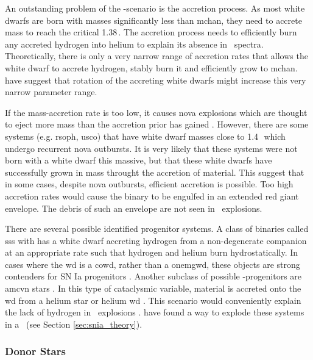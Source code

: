 An outstanding problem of the \sd-scenario is the accretion process.  As most white dwarfs are born with masses significantly less than \gls{mchan}, they need to accrete mass to reach the critical 1.38\,\msun. The accretion process needs to efficiently burn any accreted hydrogen into helium to  explain its absence in \sneia\ spectra. Theoretically, there is only a very narrow range of accretion rates that allows the white dwarf to accrete hydrogen, stably burn it and efficiently grow to \gls{mchan}. \cite{2004A&A...419..623Y} have suggest that rotation of the accreting white dwarfs might increase this very narrow parameter range.

 If the mass-accretion rate is too low, it causes nova explosions which are thought to eject more mass than the accretion prior has gained \citep{Nomoto:1982p451}. However, there are some systems (e.g. \gls{rsoph}, \gls{usco}) that have white dwarf masses close to 1.4\,\msun\ which undergo recurrent nova outbursts. It is very likely that these systems were not born with a white dwarf this massive, but that these white dwarfs have successfully grown in mass throught the accretion of material. This suggest that in some cases, despite nova outbursts, efficient accretion is possible. Too high accretion rates would cause the binary to be engulfed in an extended red giant envelope. The debris of such an envelope are not seen in \snia\ explosions. 
 
There are several possible identified progenitor systems. A class of binaries called \gls{sss} with has a white dwarf accreting hydrogen from a non-degenerate companion at an appropriate rate such that hydrogen and helium burn hydrostatically. In cases where the \gls{wd} is a \gls{cowd}, rather than a \gls{onemgwd}, these objects are strong contenders for SN Ia progenitors \citep[][and references therein]{2006astro.ph..6364D}. Another subclass of possible \sd-progenitors are \gls{amcvn} stars \citep{2005ASPC..330...27N}. In this type of cataclysmic variable, material is accreted onto the \gls{wd} from a helium star or helium \gls{wd} \citep{1992A&A...262...97V}. This scenario would conveniently explain the lack of hydrogen in \snia\ explosions . \citet[][]{2010A&A...514A..53F} have found a way to explode these systems in a \snia\ (see Section \ref{sec:snia_theory}).


\subsubsection{Donor Stars}

